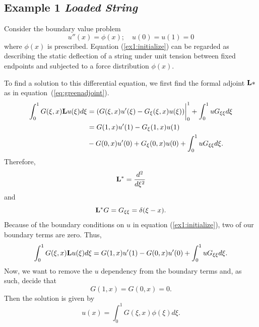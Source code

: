\subsection{Example 1 \textit{ Loaded String}}
    
    Consider the boundary value problem
    \begin{equation} \label{ex1:initialize}
        u''(x) = \phi(x);\quad u(0)=u(1)=0
    \end{equation}
    where \(\phi(x)\) is prescribed. Equation (\ref{ex1:initialize}) can be regarded as describing the static deflection of a string under unit tension between fixed endpoints and subjected to a force distribution \(\phi(x)\).

    
    
    To find a solution to this differential equation, we first find the formal adjoint \(\mathrm{\bf{L}}*\) as in equation~(\ref{eq:greenadjoint}). 
    \begin{equation}
        \begin{split}
            \int_{0}^{1} G(\xi, x)\mathrm{\bf{L}} u(\xi) d\xi  &= (G(\xi, x)u'(\xi)-G_\xi (\xi, x)u(\xi))\biggr\rvert_0^1 + \int_{0}^{1} uG_{\xi\xi}d\xi\\
            &= G(1, x)u'(1) - G_\xi(1, x)u(1) \\&- G(0, x)u'(0) + G_\xi(0,x)u(0) + \int_{0}^{1} uG_{\xi\xi}d\xi.
        \end{split}
    \end{equation}
    Therefore, 
    \begin{equation}
        \mathrm{\bf{L^*}} = \frac{d^2}{d\xi^2}
    \end{equation}
    and 
    \begin{equation}\label{eq:loadedStringLstarG}
        \mathrm{\bf{L^*}} G = G_{\xi\xi} = \delta(\xi-x).
    \end{equation}
    Because of the boundary conditions on \(u\) in equation (\ref{ex1:initialize}), two of our boundary terms are zero. Thus,
    \begin{equation}
        \int_{0}^{1} G(\xi, x)\mathrm{\bf{L}} u(\xi) d\xi = G(1, x)u'(1) - G(0, x)u'(0) + \int_{0}^{1} uG_{\xi\xi}d\xi.
    \end{equation}
    Now, we want to remove the \(u\) dependency from the boundary terms and, as such, decide that
    \begin{equation}
        G(1,x) = G(0,x) = 0.
    \end{equation}
    Then the solution is given by 
    \begin{equation}\label{eq:loadSln}
        u(x) = \int_0^1 G(\xi,x)\phi(\xi)d\xi.
    \end{equation}
